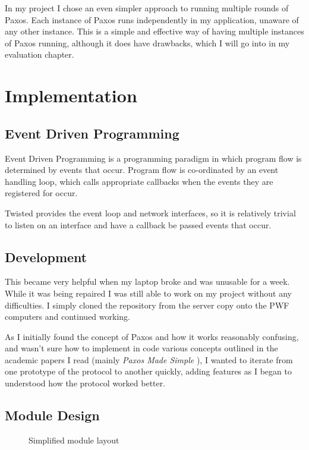 \documentclass[12pt,twoside,notitlepage]{report}
\newcommand{\lwincludegraphics}[2][]{%
  \sbox{0}{\texttt{[image: \#2]}}%
  \ifdim\wd0>\linewidth
    \resizebox{\linewidth}{!}{\box0 }%
  \else
    \leavevmode\box0
  \fi}
\begin{document}
In my project I chose an even simpler approach to running multiple rounds of Paxos. Each instance
of Paxos runs independently in my application, unaware of any other instance. This is a simple and
effective way of having multiple instances of Paxos running, although it does have drawbacks,
which I will go into in my evaluation chapter.


\cleardoublepage
\chapter{Implementation}

\section{Event Driven Programming}

Event Driven Programming is a programming paradigm in which program flow is determined by events
that occur. Program flow is co-ordinated by an event handling loop, which calls appropriate
callbacks when the events they are registered for occur.

Twisted provides the event loop and network interfaces, so it is relatively trivial to listen on
an interface and have a callback be passed events that occur.

\section{Development}

This became very helpful when my laptop broke and was unusable for a week. While it was being
repaired I was still able to work on my project without any difficulties. I simply cloned the
repository from the server copy onto the PWF computers and continued working.

As I initially found the concept of Paxos and how it works reasonably confusing, and wasn't
sure how to implement in code various concepts outlined in the academic papers I read (mainly
\emph{Paxos Made Simple} \cite{lamport01}), I wanted to iterate from one prototype of the protocol
to another quickly, adding features as I began to understood how the protocol worked better.

\section{Module Design}

\begin{figure}[htb]
\centering
\lwincludegraphics[scale=0.5]{figs/module-layout.eps}
\caption{\label{fig:module-layout}Simplified module layout}
\end{figure}
\end{document}
